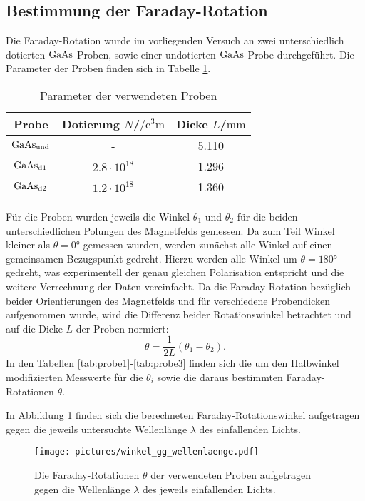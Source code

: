 \subsection{Bestimmung der Faraday-Rotation}
Die Faraday-Rotation wurde im vorliegenden Versuch an zwei unterschiedlich dotierten $\ce{GaAs}$-Proben, sowie einer undotierten $\ce{GaAs}$-Probe durchgeführt.
Die Parameter der Proben finden sich in Tabelle \ref{tab:params}.
\begin{table}
  \centering
  \caption{Parameter der verwendeten Proben}
  \label{tab:params}
  \begin{tabular}{ccc}
    \toprule
    Probe&Dotierung $N$/$\si{\per\cubic\centi\metre}$&Dicke $L$/$\si{\milli\meter}$\\
    \midrule
    $\ce{GaAs}_{\mathrm{und}}$&-&5.110\\
    $\ce{GaAs}_{\mathrm{d1}}$&$2.8\cdot 10^{18}$&1.296\\
    $\ce{GaAs}_{\mathrm{d2}}$&$1.2\cdot 10^{18}$&1.360\\
    \bottomrule
  \end{tabular}
\end{table}

Für die Proben wurden jeweils die Winkel $\theta_1$ und $\theta_2$ für die beiden unterschiedlichen Polungen des Magnetfelds gemessen. Da zum Teil Winkel kleiner als $\theta=\ang{0}$ gemessen wurden, werden zunächst  alle Winkel auf einen gemeinsamen Bezugspunkt gedreht. Hierzu werden alle Winkel um $\theta=\ang{180}$ gedreht, was experimentell der genau gleichen Polarisation entspricht und die weitere Verrechnung der Daten vereinfacht.
Da die Faraday-Rotation bezüglich beider Orientierungen des Magnetfelds und für verschiedene Probendicken aufgenommen wurde, wird die Differenz beider Rotationswinkel betrachtet und auf die Dicke $L$ der Proben normiert:
\begin{equation}
  \theta=\frac{1}{2L}\left(\theta_1-\theta_2\right)\mathrm{.}
\end{equation}
In den Tabellen \ref{tab:probe1}-\ref{tab:probe3} finden sich die um den Halbwinkel modifizierten Messwerte für die $\theta_i$ sowie die daraus bestimmten Faraday-Rotationen $\theta$.



In Abbildung \ref{fig:faraday} finden sich die berechneten Faraday-Rotationswinkel aufgetragen gegen die jeweils untersuchte Wellenlänge $\lambda$ des einfallenden Lichts.

\begin{figure}
  \centering
  \texttt{[image: pictures/winkel\_gg\_wellenlaenge.pdf]}
  \caption{Die Faraday-Rotationen $\theta$ der verwendeten Proben aufgetragen gegen die Wellenlänge $\lambda$ des jeweils einfallenden Lichts.}
  \label{fig:faraday}
\end{figure}
\FloatBarrier
